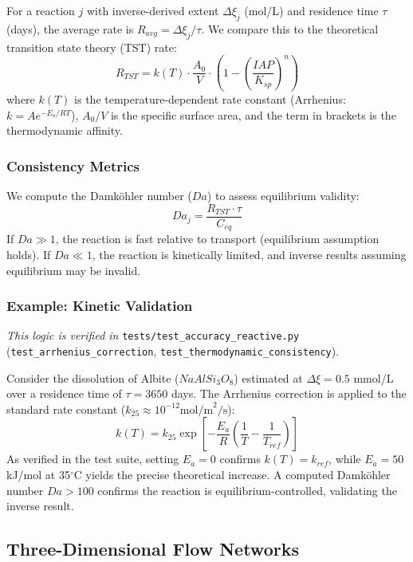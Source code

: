 \documentclass[12pt,a4paper]{article}
\theoremstyle{plain}
\theoremstyle{definition}
\theoremstyle{remark}
\begin{document}
For a reaction $j$ with inverse-derived extent $\Delta \xi_j$ (mol/L) and residence time $\tau$ (days), the average rate is $R_{avg} = \Delta \xi_j / \tau$. We compare this to the theoretical transition state theory (TST) rate:
\begin{equation}
	R_{TST} = k(T) \cdot \frac{A_0}{V} \cdot \left( 1 - \left( \frac{IAP}{K_{sp}} \right)^n \right)
\end{equation}
where $k(T)$ is the temperature-dependent rate constant (Arrhenius: $k = A e^{-E_a/RT}$), $A_0/V$ is the specific surface area, and the term in brackets is the thermodynamic affinity.

\subsubsection{Consistency Metrics}

We compute the Damköhler number ($Da$) to assess equilibrium validity:
\begin{equation}
	Da_j = \frac{R_{TST} \cdot \tau}{C_{eq}}
\end{equation}
If $Da \gg 1$, the reaction is fast relative to transport (equilibrium assumption holds). If $Da \ll 1$, the reaction is kinetically limited, and inverse results assuming equilibrium may be invalid.

\subsubsection{Example: Kinetic Validation}

\textit{This logic is verified in} \texttt{tests/test\_accuracy\_reactive.py} (\texttt{test\_arrhenius\_correction}, \texttt{test\_thermodynamic\_consistency}).

Consider the dissolution of Albite ($NaAlSi_3O_8$) estimated at $\Delta \xi = 0.5$ mmol/L over a residence time of $\tau = 3650$ days. The Arrhenius correction is applied to the standard rate constant ($k_{25} \approx 10^{-12} \text{mol/m}^2\text{/s}$):
\begin{equation}
	k(T) = k_{25} \exp\left[-\frac{E_a}{R}\left(\frac{1}{T} - \frac{1}{T_{ref}}\right)\right]
\end{equation}
As verified in the test suite, setting $E_a=0$ confirms $k(T)=k_{ref}$, while $E_a=50$ kJ/mol at 35$^\circ$C yields the precise theoretical increase. A computed Damköhler number $Da > 100$ confirms the reaction is equilibrium-controlled, validating the inverse result.

\subsection{Three-Dimensional Flow Networks}
\end{document}
